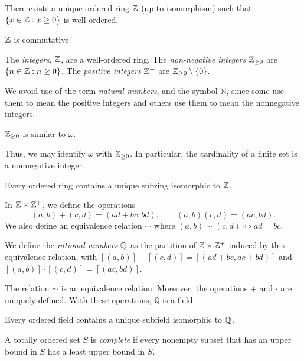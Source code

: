   \begin{thm}
    There exists a unique ordered ring $\mathbb{Z}$ (up to isomorphism) such that $\{x\in
      \mathbb{Z}:x\ge 0\}$ is well-ordered.

    $\mathbb{Z}$ is commutative.
  \end{thm}
  \begin{defn}
    The \emph{integers}, $\mathbb{Z}$, are a well-ordered ring. The \emph{non-negative
      integers} $\mathbb{Z}_{\ge 0}$ are $\{n\in\mathbb{Z}: n\ge 0\}$. The \emph{positive
      integers} $\mathbb{Z}^+$ are $\mathbb{Z}_{\ge 0}\setminus \{0\}$.
  \end{defn}
  \begin{rem}
    We avoid use of the term \emph{natural numbers}, and the symbol $\mathbb N$, since
    some use them to mean the positive integers and others use them to mean the
    nonnegative integers.
  \end{rem}
  \begin{prop}
    $\mathbb{Z}_{\ge 0}$ is similar to $\omega$.
  \end{prop}
  \begin{rem}
    Thus, we may identify $\omega$ with $\mathbb{Z}_{\ge 0}$. In particular, the
    cardinality of a finite set is a nonnegative integer.
  \end{rem}
  \begin{prop}
    Every ordered ring contains a unique subring isomorphic to $\mathbb{Z}$.
  \end{prop}
  \begin{defn}
    In $\mathbb{Z}\times\mathbb{Z}^+$, we define the operations
    \[(a,b)+(c,d)=(ad+bc,bd),\qquad (a,b)(c,d)=(ac,bd).\]
    We also define an equivalence relation $\sim$ where
    $(a,b)\sim (c,d)\iff ad=bc$.

    We define the \emph{rational numbers} $\mathbb{Q}$ as the partition
    of $\mathbb{Z}\times\mathbb{Z}^+$ induced by this equivalence relation, with
    $[(a,b)]+[(c,d)]=[(ad+bc,ac+bd)]$ and $[(a,b)]\cdot [(c,d)]=[(ac,bd)]$.
  \end{defn}
  \begin{prop}
    The relation $\sim$ is an equivalence relation. Moreover, the operations $+$
    and $\cdot$ are uniquely defined. With these operations, $\mathbb Q$ is a
    field.
  \end{prop}
  \begin{prop}
    Every ordered field contains a unique subfield isomorphic to $\mathbb{Q}$.
  \end{prop}
  \begin{defn}
    A totally ordered set $S$ is \emph{complete} if every nonempty subset that has
    an upper bound in $S$ has a least upper bound in $S$.
  \end{defn}
